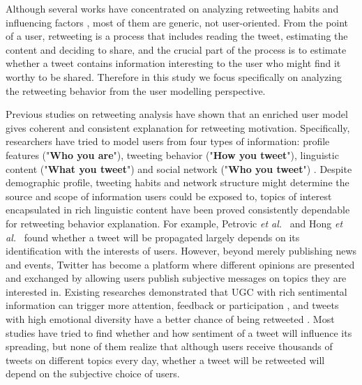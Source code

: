\documentclass[twocolumn]{svjour3}          %
\begin{document}
Although several works have concentrated on analyzing retweeting habits and influencing factors \cite{Boyd2010,Kwak:2010TSN,Suh2010}, most of them are generic, not user-oriented.
From the point of a user, retweeting is a process that includes reading the tweet, estimating the content and deciding to share, and the crucial part of the process is to estimate whether a tweet contains information interesting to the user who might find it worthy to be shared.
Therefore in this study we focus specifically on analyzing the retweeting behavior from the user modelling perspective.

Previous studies on retweeting analysis have shown that an enriched user model gives coherent and consistent explanation for retweeting motivation\cite{Abel:2011AUM,conf/icwsm/MacskassyM11,conf/wsdm/FengW13}. 
Specifically, researchers have tried to model users from four types of information:
profile features ("\textbf{Who you are}"), tweeting behavior ("\textbf{How you tweet}"), linguistic content ("\textbf{What you tweet}") and social network ("\textbf{Who you tweet}") \cite{Pennacchiotti:icwsm11}. 
Despite demographic profile, tweeting habits and network structure might determine the source and scope of information users could be exposed to, topics of interest encapsulated in rich linguistic content have been proved consistently dependable for retweeting behavior explanation. 
For example, Petrovic \emph{et al.}~\cite{Osborne_Lavrenko_2011} and Hong \emph{et al.}~\cite{ericmedvet:hong2011} found whether a tweet will be propagated largely depends on its identification with the interests of users. 
However, beyond merely publishing news and events, Twitter has become a platform where different opinions are presented and exchanged by allowing users publish subjective messages on topics they are interested in. 
Existing researches demonstrated that UGC with rich sentimental information can trigger more attention, feedback or participation \cite{DBLP:conf/hicss/StieglitzD12}, and tweets with high emotional diversity have a better chance of being retweeted \cite{conf/icwsm/PfitznerGS12}.
Most studies have tried to find whether and how sentiment of a tweet will influence its spreading, but none of them realize that although users receive thousands of tweets on different topics every day, whether a tweet will be retweeted will depend on the subjective choice of users. 
\end{document}

